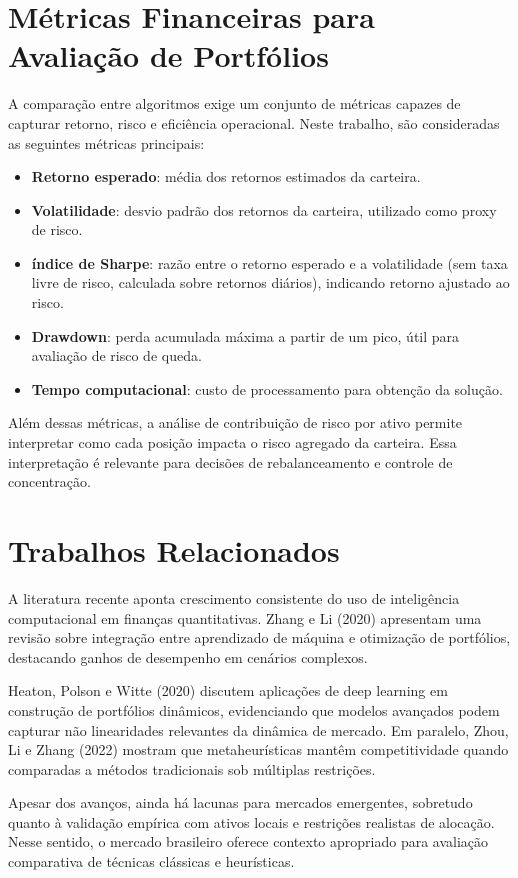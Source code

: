 \documentclass[
  12pt,
  oneside,
  a4paper,
  brazil
]{abntex2}
\begin{document}
\section{Métricas Financeiras para Avaliação de Portfólios}
A comparação entre algoritmos exige um conjunto de métricas capazes de capturar retorno, risco e eficiência operacional. Neste trabalho, são consideradas as seguintes métricas principais:
\begin{itemize}
  \item \textbf{Retorno esperado}: média dos retornos estimados da carteira.
  \item \textbf{Volatilidade}: desvio padrão dos retornos da carteira, utilizado como proxy de risco.
  \item \textbf{índice de Sharpe}: razão entre o retorno esperado e a volatilidade (sem taxa livre de risco, calculada sobre retornos diários), indicando retorno ajustado ao risco.
  \item \textbf{Drawdown}: perda acumulada máxima a partir de um pico, útil para avaliação de risco de queda.
  \item \textbf{Tempo computacional}: custo de processamento para obtenção da solução.
\end{itemize}

Além dessas métricas, a análise de contribuição de risco por ativo permite interpretar como cada posição impacta o risco agregado da carteira. Essa interpretação é relevante para decisões de rebalanceamento e controle de concentração.

\section{Trabalhos Relacionados}
A literatura recente aponta crescimento consistente do uso de inteligência computacional em finanças quantitativas. Zhang e Li (2020) apresentam uma revisão sobre integração entre aprendizado de máquina e otimização de portfólios, destacando ganhos de desempenho em cenários complexos.

Heaton, Polson e Witte (2020) discutem aplicações de deep learning em construção de portfólios dinâmicos, evidenciando que modelos avançados podem capturar não linearidades relevantes da dinâmica de mercado. Em paralelo, Zhou, Li e Zhang (2022) mostram que metaheurísticas mantêm competitividade quando comparadas a métodos tradicionais sob múltiplas restrições.

Apesar dos avanços, ainda há lacunas para mercados emergentes, sobretudo quanto à validação empírica com ativos locais e restrições realistas de alocação. Nesse sentido, o mercado brasileiro oferece contexto apropriado para avaliação comparativa de técnicas clássicas e heurísticas.
\end{document}
